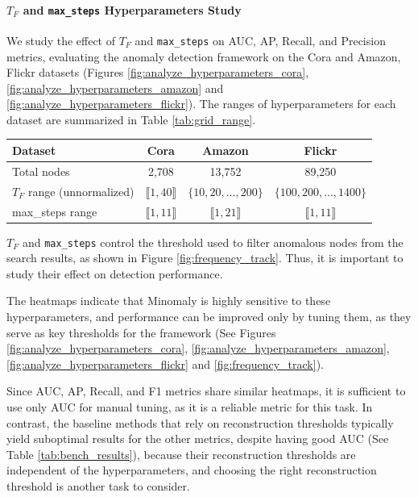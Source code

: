 \documentclass[pdflatex,sn-mathphys-num]{sn-jnl}%
\renewenvironment{table}[1][]%
{\tableorg[#1]%
\tablebodyfont%
\renewcommand\footnotetext[2][]{{\removelastskip\vskip0pt%
\let\tablebodyfont\tablefootnotefont%
\hskip0pt\if!##1!\else{\smash{$^{##1}$}}\fi##2\par}}%
}{\endtableorg}
\theoremstyle{thmstyleone}%
\theoremstyle{thmstyletwo}%
\theoremstyle{thmstylethree}%
\begin{document}
\paragraph{$T_F$ and \texttt{max\_steps} Hyperparameters Study}
We study the effect of $T_F$ and \texttt{max\_steps} on AUC, AP, Recall, and Precision metrics, evaluating the anomaly detection framework on the Cora and Amazon, Flickr datasets (Figures \ref{fig:analyze_hyperparameters_cora}, \ref{fig:analyze_hyperparameters_amazon} and \ref{fig:analyze_hyperparameters_flickr}). The ranges of hyperparameters for each dataset are summarized in Table \ref{tab:grid_range}.
\begin{table}[H]
\vspace*{-20pt}
\caption{Hyperparameter ranges for different datasets}
\label{tab:grid_range}
\centering
\begin{tabular}{lccc}
\hline
\textbf{Dataset} & \textbf{Cora} & \textbf{Amazon} & \textbf{Flickr} \\
\hline
Total nodes & 2,708 & 13,752 & 89,250 \\
$T_F$ range (unnormalized) & $\llbracket 1, 40 \rrbracket$ & $\{10, 20, \ldots, 200\}$ & $\{100, 200, \ldots, 1400\}$ \\
max\_steps range & $\llbracket 1, 11 \rrbracket$ & $\llbracket 1, 21 \rrbracket$ & $\llbracket 1, 11 \rrbracket$ \\
\hline
\end{tabular}
\vspace*{-10pt}
\end{table}

$T_F$ and \texttt{max\_steps} control the threshold used to filter anomalous nodes from the search results, as shown in Figure \ref{fig:frequency_track}. Thus, it is important to study their effect on detection performance.

The heatmaps indicate that Minomaly is highly sensitive to these hyperparameters, and performance can be improved only by tuning them, as they serve as key thresholds for the framework (See Figures \ref{fig:analyze_hyperparameters_cora}, \ref{fig:analyze_hyperparameters_amazon}, \ref{fig:analyze_hyperparameters_flickr} and \ref{fig:frequency_track}).

Since AUC, AP, Recall, and F1 metrics share similar heatmaps, it is sufficient to use only AUC for manual tuning, as it is a reliable metric for this task. In contrast, the baseline methods that rely on reconstruction thresholds typically yield suboptimal results for the other metrics, despite having good AUC (See Table \ref{tab:bench_results}), because their reconstruction thresholds are independent of the hyperparameters, and choosing the right reconstruction threshold is another task to consider.
\end{document}
